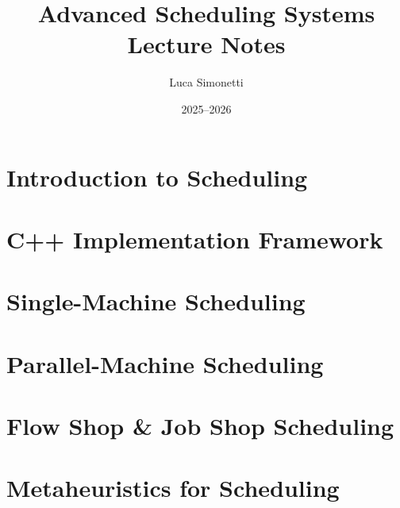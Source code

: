 \documentclass[11pt, oneside]{book}
\title{\textbf{Advanced Scheduling Systems}\\[4pt]
       \large Lecture Notes}
\author{Luca Simonetti}
\date{2025--2026}
\begin{document}
\maketitle
\tableofcontents

\chapter{Introduction to Scheduling}





\chapter{C++ Implementation Framework}


\chapter{Single-Machine Scheduling}
% 

\chapter{Parallel-Machine Scheduling}
% 

\chapter{Flow Shop \& Job Shop Scheduling}
% 

\chapter{Metaheuristics for Scheduling}
% 
\end{document}
